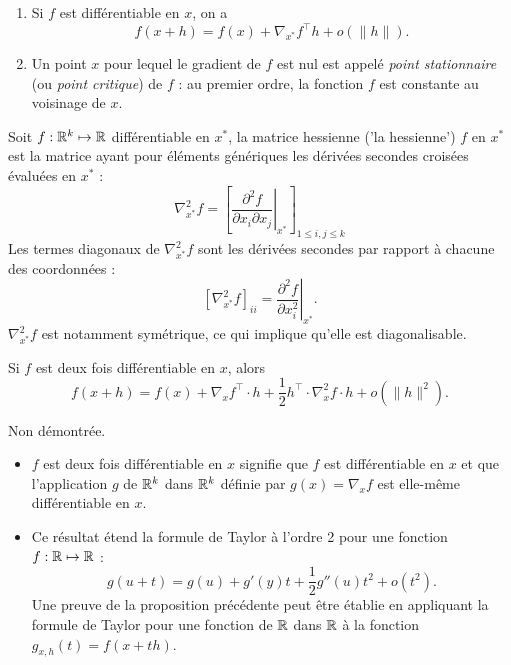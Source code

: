 \remark
\begin{enumerate}
  \item Si $f$ est différentiable en $x$, on a
  $$
  f(x + h) = f(x) + \nabla_{x^*}f^\top h + o(\|h\|).
  $$
  \item Un point $x$ pour lequel le gradient de $f$ est nul est appelé {\em point stationnaire} (ou {\em point critique}) de $f$ : au premier ordre, la fonction $f$ est constante au voisinage de $x$.
\end{enumerate}


\begin{definition*}
  Soit $f : \mathbb{R}^k \mapsto \mathbb{R}$ différentiable en $x^*$, la matrice hessienne ('la hessienne') $f$ en $x^*$ est la matrice ayant pour éléments génériques les dérivées secondes croisées évaluées en $x^*$ : 
  $$
  \nabla^2_{x^*}f 
  = \left[\left.\frac{\partial^2 f}{\partial x_i\partial x_j}\right|_{x^*} \right]_{1 \leq i, j \leq k}
  $$
  Les termes diagonaux de $\nabla^2_{x^*}f$ sont les dérivées secondes par rapport à chacune des coordonnées : 
  $$
  \left[ \nabla^2_{x^*}f \right]_{ii} 
  = \left.\frac{\partial^2 f}{\partial x_i^2}\right|_{x^*}.
  $$
  $\nabla^2_{x^*}f$ est notamment symétrique, ce qui implique qu'elle est diagonalisable.
\end{definition*}

\begin{proposition*}
  Si $f$ est deux fois différentiable en $x$, alors
  $$
  f(x+h) = f(x) + \nabla_x f^\top \cdot h + \frac12 h^\top \cdot \nabla^2_x f \cdot h + o(\|h\|^2).
  $$
\end{proposition*}

\proof Non démontrée. \eproof

\remark
\begin{itemize}
 \item $f$ est deux fois différentiable en $x$ signifie que $f$ est différentiable en $x$ et que l'application $g$ de $\mathbb{R}^k$ dans $\mathbb{R}^k$ définie par $g(x) = \nabla_x f$ est elle-même différentiable en $x$.
 \item Ce résultat étend la formule de Taylor à l'ordre 2 pour une fonction $f : \mathbb{R} \mapsto \mathbb{R}$ : 
 $$
 g(u+t) = g(u) + g'(y) t + \frac12 g''(u) t^2 + o(t^2).
 $$
 Une preuve de la proposition précédente peut être établie en appliquant la formule de Taylor pour une fonction de $\mathbb{R}$ dans $\mathbb{R}$ à la fonction $g_{x, h}(t) = f(x + th)$.
\end{itemize}


